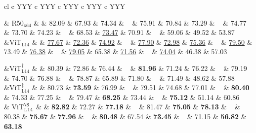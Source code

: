 \begin{table}[bp]
\begin{tabularx}{\textwidth}{cl c YYY c YYY c YYY c YYY c YYY}


\parbox[t]{1mm}{}
& {R50$_{\text{x64}}$} &  & 
82.09 & 67.93 & 74.34  & ~ &
75.91 & 70.84 & 73.29  & ~ & 
74.77 & 73.70 & 74.23  & ~ &
68.53 & \underline{73.47} & 70.91  & ~ &
59.06 & 49.52 & 53.87  \\



&{ViT$_{\text{L14}}$} &  & 
\underline{77.67} & \underline{72.36} & \underline{74.92}  & ~ &
\underline{77.90} & \underline{72.98} & \underline{75.36}  & ~ &
\underline{79.50} & 73.49 & \underline{76.38}  & ~ &
\underline{79.05} & 65.38 & \underline{71.56}  & ~ &
\underline{74.04} & 46.38 & 57.03  \\

{}

&{ViT$_{\text{L14}}^\dag$} &  & 
80.39 & 72.86 & 76.44  & ~ &
\textbf{81.96} & 71.24 & 76.22  & ~ & 
79.19 & 74.70 & 76.88  & ~ &
78.87 & 65.89 & 71.80  & ~ &
71.49 & 48.62 & 57.88  \\

&{ViT$_{\text{L14}}^\ddag$} &  & 
80.73 & \textbf{73.59} & 76.99  & ~ &
79.51 & 74.68 & 77.01  & ~ &
\textbf{80.40} & 74.33 & 77.25  & ~ &
79.47 & \textbf{68.25} & 73.44  & ~ &
\textbf{75.12} & 51.14 & 60.86 \\

& {ViT$_{\text{L14}}^\S$} &   & 
 \textbf{82.82} &  72.27 &  \textbf{77.18}  &  ~ &
 81.47 &  \textbf{75.05} &  \textbf{78.13}  &  ~ &
 80.38 &  \textbf{75.67} &  \textbf{77.96}  &  ~ &
 \textbf{80.48} &  67.54 &  \textbf{73.45}  &  ~ &
 71.15 &  \textbf{56.82} &  \textbf{63.18} \\


\end{tabularx}
\end{table}
